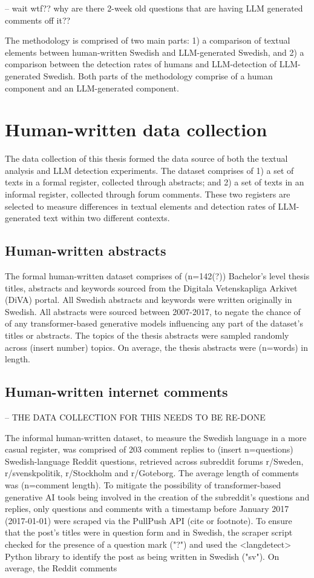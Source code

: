 \documentclass[thesis]{cluu}
\begin{document}
-- wait wtf?? why are there 2-week old questions that are having LLM generated comments off it??

The methodology is comprised of two main parts: 1) a comparison
of textual elements between human-written Swedish and
LLM-generated Swedish, and 2) a comparison between the detection
rates of humans and LLM-detection of LLM-generated Swedish. Both
parts of the methodology comprise of a human component and an
LLM-generated component.



\section{Human-written data collection}

The data collection of this thesis formed the data source of
both the textual analysis and LLM detection experiments. The
dataset comprises of 1) a set of texts in a formal register,
collected through abstracts; and 2) a set of texts in an
informal register, collected through forum comments. These two
registers are selected to measure differences in textual
elements and detection rates of LLM-generated text within two
different contexts.

\subsection{Human-written abstracts}

The formal human-written dataset comprises of (n=142(?))
Bachelor's level thesis titles, abstracts and keywords sourced
from the Digitala Vetenskapliga Arkivet (DiVA) portal. All
Swedish abstracts and keywords were written originally in
Swedish. All abstracts were sourced between 2007-2017, to negate
the chance of of any transformer-based generative models
influencing any part of the dataset's titles or abstracts. The
topics of the thesis abstracts were sampled randomly across
(insert number) topics. On average, the thesis abstracts were
(n=words) in length.

\subsection{Human-written internet comments}

-- THE DATA COLLECTION FOR THIS NEEDS TO BE RE-DONE

The informal human-written dataset, to measure the Swedish
language in a more casual register, was comprised of 203 comment
replies to (insert n=questions) Swedish-language Reddit
questions, retrieved across subreddit forums r/Sweden,
r/svenskpolitik, r/Stockholm and r/Goteborg. The average length
of comments was (n=comment length). To mitigate the possibility
of transformer-based generative AI tools being involved in the
creation of the subreddit's questions and replies, only
questions and comments with a timestamp before January 2017
(2017-01-01) were scraped via the PullPush API (cite or
footnote). To ensure that the post's titles were in question
form and in Swedish, the scraper script checked for the presence
of a question mark ("?") and used the <langdetect> Python
library to identify the post as being written in Swedish ("sv").
On average, the Reddit comments
\end{document}
